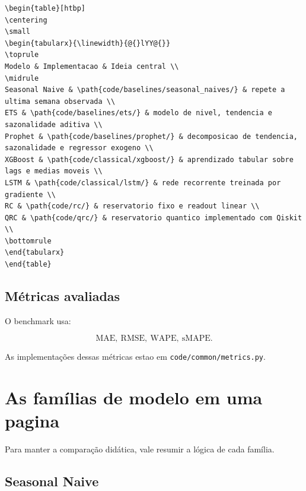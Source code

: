 \documentclass[12pt]{article}
\begin{document}
\begin{verbatim}
\begin{table}[htbp]
\centering
\small
\begin{tabularx}{\linewidth}{@{}lYY@{}}
\toprule
Modelo & Implementacao & Ideia central \\
\midrule
Seasonal Naive & \path{code/baselines/seasonal_naives/} & repete a ultima semana observada \\
ETS & \path{code/baselines/ets/} & modelo de nivel, tendencia e sazonalidade aditiva \\
Prophet & \path{code/baselines/prophet/} & decomposicao de tendencia, sazonalidade e regressor exogeno \\
XGBoost & \path{code/classical/xgboost/} & aprendizado tabular sobre lags e medias moveis \\
LSTM & \path{code/classical/lstm/} & rede recorrente treinada por gradiente \\
RC & \path{code/rc/} & reservatorio fixo e readout linear \\
QRC & \path{code/qrc/} & reservatorio quantico implementado com Qiskit \\
\bottomrule
\end{tabularx}
\end{table}
\end{verbatim}

\subsection{Métricas avaliadas}\label{34-muxe9tricas-avaliadas}

O benchmark usa:

\[
\mathrm{MAE},\ \mathrm{RMSE},\ \mathrm{WAPE},\ \mathrm{sMAPE}.
\]

As implementações dessas métricas estao em \texttt{code/common/metrics.py}.

\section{As famílias de modelo em uma pagina}\label{4-as-famuxedlias-de-modelo-em-uma-pagina}

Para manter a comparação didática, vale resumir a lógica de cada família.

\subsection{Seasonal Naive}\label{41-seasonal-naive}
\end{document}

